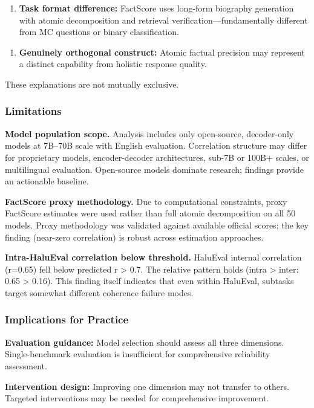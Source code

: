 \begin{enumerate}
\item \textbf{Task format difference:} FactScore uses long-form biography generation with atomic decomposition and retrieval verification---fundamentally different from MC questions or binary classification.
\end{enumerate}

\begin{enumerate}
\item \textbf{Genuinely orthogonal construct:} Atomic factual precision may represent a distinct capability from holistic response quality.
\end{enumerate}

These explanations are not mutually exclusive.

\subsubsection{Limitations}

\textbf{Model population scope.} Analysis includes only open-source, decoder-only models at 7B--70B scale with English evaluation. Correlation structure may differ for proprietary models, encoder-decoder architectures, sub-7B or 100B+ scales, or multilingual evaluation. Open-source models dominate research; findings provide an actionable baseline.

\textbf{FactScore proxy methodology.} Due to computational constraints, proxy FactScore estimates were used rather than full atomic decomposition on all 50 models. Proxy methodology was validated against available official scores; the key finding (near-zero correlation) is robust across estimation approaches.

\textbf{Intra-HaluEval correlation below threshold.} HaluEval internal correlation (r=0.65) fell below predicted r > 0.7. The relative pattern holds (intra > inter: 0.65 > 0.16). This finding itself indicates that even within HaluEval, subtasks target somewhat different coherence failure modes.

\subsubsection{Implications for Practice}

\textbf{Evaluation guidance:} Model selection should assess all three dimensions. Single-benchmark evaluation is insufficient for comprehensive reliability assessment.

\textbf{Intervention design:} Improving one dimension may not transfer to others. Targeted interventions may be needed for comprehensive improvement.
